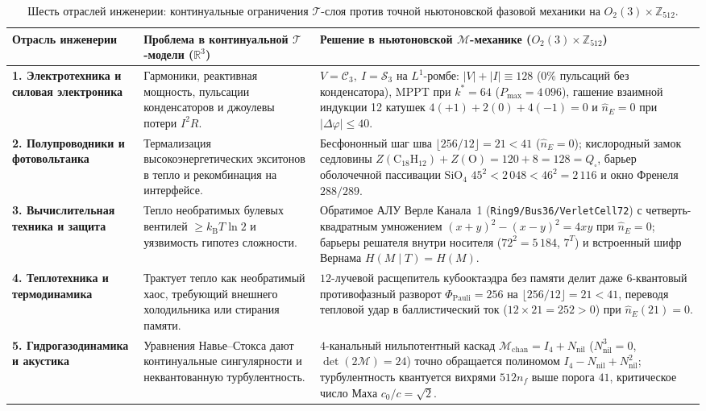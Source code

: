 \begin{table}[htbp]
\centering
\caption{Шесть отраслей инженерии: континуальные ограничения $\mathcal{T}$-слоя против точной ньютоновской фазовой механики на $O_2(3)\times\mathbb{Z}_{512}$.}
\label{tab:course-six-engineering-branches}
\footnotesize
\begin{tabular}{@{}p{}p{}p{}@{}}
\toprule
\textbf{Отрасль инженерии} & \textbf{Проблема в континуальной $\mathcal{T}$-модели ($\mathbb{R}^3$)} & \textbf{Решение в ньютоновской $\mathcal{M}$-механике ($O_2(3)\times\mathbb{Z}_{512}$)} \\
\midrule
\textbf{1. Электротехника и силовая электроника} &
Гармоники, реактивная мощность, пульсации конденсаторов и джоулевы потери $I^2 R$. &
$V=\mathcal{C}_3,\ I=\mathcal{S}_3$ на $L^1$-ромбе: $|V|+|I|\equiv 128$ ($0\%$ пульсаций без конденсатора), MPPT при $k^*=64$ ($P_{\max}=4\,096$), гашение взаимной индукции 12 катушек $4(+1)+2(0)+4(-1)=0$ и $\hat{n}_E=0$ при $|\Delta\varphi|\le 40$. \\
\addlinespace[3pt]
\textbf{2. Полупроводники и фотовольтаика} &
Термализация высокоэнергетических экситонов в тепло и рекомбинация на интерфейсе. &
Бесфононный шаг шва $\lfloor 256/12\rfloor = 21 < 41$ ($\hat{n}_E=0$); кислородный замок седловины $Z(\mathrm{C_{18}H_{12}})+Z(\mathrm{O})=120+8=128=Q_\square$, барьер оболочечной пассивации $\mathrm{SiO}_4$ $45^2 < 2\,048 < 46^2 = 2\,116$ и окно Френеля $288/289$. \\
\addlinespace[3pt]
\textbf{3. Вычислительная техника и защита} &
Тепло необратимых булевых вентилей $\ge k_{\mathrm{B}}T\ln 2$ и уязвимость гипотез сложности. &
Обратимое АЛУ Верле Канала~1 (\texttt{Ring9/Bus36/VerletCell72}) с четверть-квадратным умножением $(x+y)^2-(x-y)^2=4xy$ при $\hat{n}_E=0$; барьеры решателя внутри носителя ($72^2=5\,184$, $7^T$) и встроенный шифр Вернама $H(M\mid T)=H(M)$. \\
\addlinespace[3pt]
\textbf{4. Теплотехника и термодинамика} &
Трактует тепло как необратимый хаос, требующий внешнего холодильника или стирания памяти. &
$12$-лучевой расщепитель кубооктаэдра без памяти делит даже $6$-квантовый противофазный разворот $\Phi_{\mathrm{Pauli}}=256$ на $\lfloor 256/12\rfloor = 21 < 41$, переводя тепловой удар в баллистический ток ($12\times 21=252>0$) при $\hat{n}_E(21)=0$. \\
\addlinespace[3pt]
\textbf{5. Гидрогазодинамика и акустика} &
Уравнения Навье--Стокса дают континуальные сингулярности и неквантованную турбулентность. &
$4$-канальный нильпотентный каскад $\mathcal{M}_{\mathrm{chan}} = I_4 + N_{\mathrm{nil}}$ ($N_{\mathrm{nil}}^3=0$, $\det(2\mathcal{M})=24$) точно обращается полиномом $I_4 - N_{\mathrm{nil}} + N_{\mathrm{nil}}^2$; турбулентность квантуется вихрями $512 n_f$ выше порога $41$, критическое число Маха $c_0/c=\sqrt{2}$. \\

\end{tabular}
\end{table}
